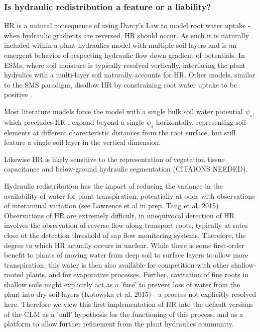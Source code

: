 \documentclass[draft,linenumbers]{agujournal}
\begin{document}
\subsubsection{Is hydraulic redistribution a feature or a liability?}
   
    HR is a natural consequence of using Darcy's Law to model root water uptake - when hydraulic gradients are reversed, HR should occur. As such it is naturally included within a plant hydraulics model with multiple soil layers and is an emergent behavior of respecting hydraulic flow down gradient of potentials.  In ESMs, where soil moisture is typically resolved vertically, interfacing the plant hydrulics with a multi-layer soil naturally accounts for HR. Other models, similar to the SMS paradigm, disallow HR by constraining root water uptake to be positive \citep{xu2016}.
    
    Most literature models force the model with a single bulk soil water potential $\psi_s$, which precludes HR \citep{fisher2007,bonan2014,sperry2017}. \cite{christoffersen2016} expand beyond a single $\psi_s$ horizontally, representing soil elements at different charecteristic distances from the root surface,  but still feature a single soil layer in the vertical dimension.  
    
    Likewise HR is likely sensitive to the representation of vegetation tissue capacitance and below-ground hydraulic segmentation (CITAIONS NEEDED).
    
    Hydraulic redistribution has the impact of reducing the variance in the availability of water for plant transpiration, potentially at odds with observations of interannual variation (see Lawrence et al in prep. Tang et al. 2015) Observations of HR are extremely difficult, in unequivocal detection of HR involves the observation of reverse flow along transport roots, typically at rates close ot the detection threshold of sap flow monitoring systems. Therefore, the degree to which HR actually occurs in unclear. While there is some first-order benefit to plants of moving water from deep soil to surface layers to allow more transpiration, this water is then also available for competition with other shallow-rooted plants, and for evaporative processes. Further, cavitation of fine roots in shallow soils might explicitly act as a 'fuse' to prevent loss of water from the plant into dry soil layers (Kotowska et al. 2015) - a process not explicitly resolved here. Therefore we view this first implementation of HR into the default versions of the CLM as a 'null' hypothesis for the functioning of this process, and as a platform to allow further refinement from the plant hydraulics community. 
    
\end{document}
